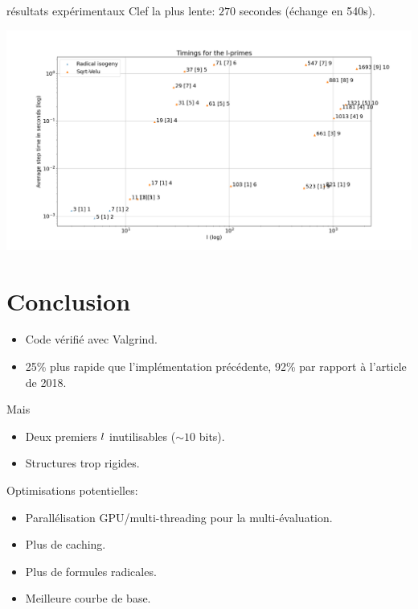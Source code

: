 \documentclass{beamer}
\begin{document}
\begin{frame}{résultats expérimentaux}
	Clef la plus lente: $270$ secondes (\'echange en 540s).
	\begin{center}
		\includegraphics[scale=0.22]{../figs/timings}
	\end{center}
\end{frame}


\section*{Conclusion}
\begin{frame}
	\begin{itemize}
		\item Code v\'erifi\'e avec Valgrind.
		\item 25\% plus rapide que l'impl\'ementation pr\'ec\'edente, 92\% par rapport \`a l'article de 2018.
	\end{itemize}
	Mais
	\begin{itemize}
		\item Deux premiers $\mathnormal{l}$ inutilisables ($\sim 10$ bits).
		\item Structures trop rigides.
	\end{itemize}
	Optimisations potentielles:
	\begin{itemize}
		\item Parall\'elisation GPU/multi-threading pour la multi-\'evaluation.
		\item Plus de caching.
		\item Plus de formules radicales.
		\item Meilleure courbe de base.
	\end{itemize}
\end{frame}
\end{document}
